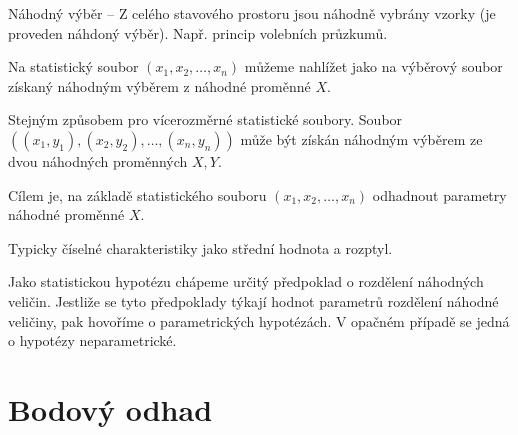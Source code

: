 \begin{compactitem}
    \item Náhodný výběr -- Z celého stavového prostoru jsou náhodně vybrány vzorky (je proveden náhdoný výběr). Např. princip volebních průzkumů.

    \item Na statistický soubor $(x_1, x_2, \ldots, x_n)$ můžeme nahlížet jako na výběrový soubor získaný náhodným výběrem z náhodné proměnné $X$. \begin{compactitem}
        \item Stejným způsobem pro vícerozměrné statistické soubory. Soubor\break $((x_1, y_1), (x_2, y_2), \ldots, (x_n, y_n))$ může být získán náhodným výběrem ze dvou náhodných proměnných $X, Y$.
    \end{compactitem}

    \item Cílem je, na základě statistického souboru $(x_1, x_2, \ldots, x_n)$ odhadnout parametry náhodné proměnné $X$. \begin{compactitem}

        \item Typicky číselné charakteristiky jako střední hodnota a rozptyl.
    \end{compactitem}

    \item Jako statistickou hypotézu chápeme určitý předpoklad o rozdělení náhodných veličin. Jestliže se tyto předpoklady týkají hodnot parametrů rozdělení náhodné veličiny, pak hovoříme o parametrických hypotézách. V opačném případě se jedná o hypotézy neparametrické.
\end{compactitem}


\section{Bodový odhad}

